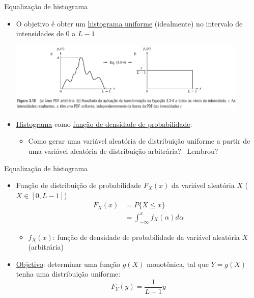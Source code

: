     \begin{slide}[toc=]{Equalização de histograma}
      \begin{itemize}
         \item O objetivo é obter um \underline{histograma uniforme} (idealmente) no intervalo de intensidades de $0$ a $L-1$
         \begin{center}
             \includegraphics[width=0.9\textwidth]{figs/fig0318}
         \end{center}\pause
         \item \underline{Histograma} como \underline{função de densidade de probabilidade}:
         \begin{itemize}
            \item Como gerar uma variável aleatória de distribuição uniforme a partir de uma variável aleatória de distribuição arbitrária?\pause
             ~Lembrou?
         \end{itemize}
      \end{itemize}
    \end{slide}

    \begin{slide}[toc=]{Equalização de histograma}
      \begin{itemize}
         \item Função de distribuição de probabilidade $F_X(x)$ da variável aleatória $X$ ($X\in [0, L-1]$)
         \begin{align*}
             F_X(x) &=P\{X\leq x\}\\
                    &=\int_{-\infty}^x f_X(\alpha)d\alpha
         \end{align*}
         \begin{itemize}
            \item $f_X(x)$: função de densidade de probabilidade da variável aleatória $X$ (arbitrária)
         \end{itemize}\pause
         \item \underline{Objetivo}: determinar uma função $g(X)$ monotônica, tal que $Y=g(X)$ tenha uma distribuição uniforme:
         \begin{equation*}
             F_Y(y) = \frac{1}{L-1}y
         \end{equation*}

      \end{itemize}
   \end{slide}    


